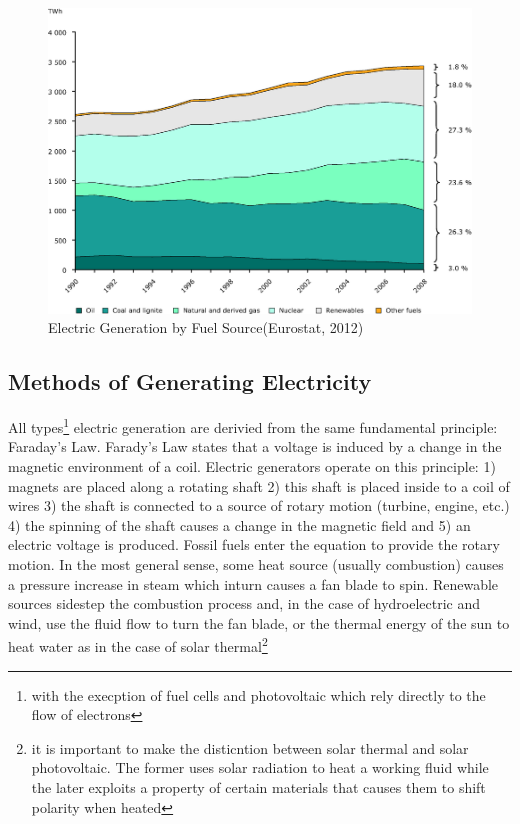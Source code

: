 \documentclass{article}
\begin{document}
\begin{figure}[H]
	\begin{center}
	\includegraphics[scale = .4]{Figures/sourceTWh.png}
	\caption{Electric Generation by Fuel Source(Eurostat, 2012)}
	\end{center}
\end{figure}

\subsection{Methods of Generating Electricity}
All types\footnote{with the execption of fuel cells and photovoltaic which rely directly to the flow of electrons} electric generation are derivied from the same fundamental principle: Faraday's Law. Farady's Law states that a voltage is induced by a change in the magnetic environment of a coil. Electric generators operate on this principle: 1) magnets are placed along a rotating shaft 2) this shaft is placed inside to a coil of wires 3) the shaft is connected to a source of rotary motion (turbine, engine, etc.) 4) the spinning of the shaft causes a change in the magnetic field and 5) an electric voltage is produced. Fossil fuels enter the equation to provide the rotary motion. In the most general sense, some heat source (usually combustion) causes a pressure increase in steam which inturn causes a fan blade to spin. Renewable sources sidestep the combustion process and, in the case of hydroelectric and wind, use the fluid flow to turn the fan blade, or the thermal energy of the sun to heat water as in the case of solar thermal\footnote{it is important to make the disticntion between solar thermal and solar photovoltaic. The former uses solar radiation to heat a working fluid while the later exploits a property of certain materials that causes them to shift polarity when heated}\*
\end{document}
